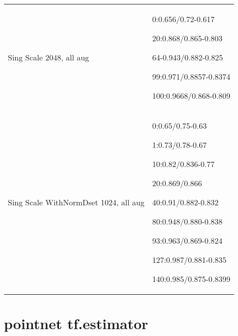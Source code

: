 \documentclass[,table,dvipsnames]{article}
\begin{document}
\noindent\begin{tabular}{|p{10cm}|p{5.5cm}| }	
	\hline
	\rowcolor{yellow!20}
	Sing Scale 2048, all aug & 0:0.656/0.72-0.617 \par 20:0.868/0.865-0.803\par  64-0.943/0.882-0.825 \par 99:0.971/0.8857-0.8374\par 100:0.9668/0.868-0.809\\
	
	\rowcolor{green!20}
	Sing Scale WithNormDset 1024, all aug& 0:0.65/0.75-0.63\par  1:0.73/0.78-0.67\par 10:0.82/0.836-0.77\par 20:0.869/0.866\par 40:0.91/0.882-0.832 \par 80:0.948/0.880-0.838 \par 93:0.963/0.869-0.824 \par 127:0.987/0.881-0.835 \par 140:0.985/0.875-0.8399\\
	\hline 	
\end{tabular}

\section{pointnet tf.estimator}
\end{document}
